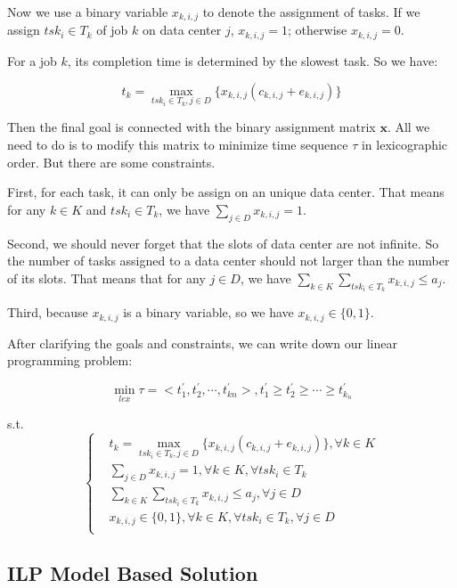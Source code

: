 \documentclass{llncs}
\begin{document}
Now we use a binary variable $ x_{k,i,j} $ to denote the assignment of tasks. If we assign $ tsk_{i} \in T_k $ of job $ k $ on data center $ j $, $ x_{k,i,j} = 1 $; otherwise  $ x_{k,i,j} = 0 $. 

For a job $ k $, its completion time is determined by the slowest task. So we have:

$$ t_k = \max\limits_{tsk_i \in T_k, j \in D} \{ x_{k,i,j}( c_{k,i,j}+e_{k,i,j}) \}$$

Then the final goal is connected with the binary assignment matrix $\mathbf{x}$. All we need to do is to modify this matrix to minimize time sequence $ \tau $ in lexicographic order. But there are some constraints. 

First, for each task, it can only be assign on an unique data center. That means for any $ k\in K $ and $ tsk_i \in T_k $, we have $ \sum\limits_{j \in D} x_{k,i,j} = 1$.

Second, we should never forget that the slots of data center are not infinite. So the number of tasks assigned to a data center should not larger than the number of its slots. That means that for any $ j \in D $, we have $  \sum\limits_{ k\in K } \sum\limits_{tsk_i \in T_k } x_{k,i,j} \leqslant a_j $.

Third, because $ x_{k,i,j} $ is a binary variable, so we have $ x_{k,i,j} \in \{0,1 \} $.

After clarifying the goals and constraints, we can write down our linear programming problem:

$$ \min\limits_{lex}  \tau = <t^{\prime}_1,t^{\prime}_2, \cdots, t^{\prime}_{kn}> , t^{\prime}_1 \geqslant t^{\prime}_2 \geqslant \cdots \geqslant t^{\prime}_{k_n} $$

s.t.
$$\left\{
\begin{aligned}  
    &t_k = \max\limits_{tsk_i \in T_k, j \in D} \{ x_{k,i,j}( c_{k,i,j}+e_{k,i,j}) \}, \forall k \in K\\
    &\sum\limits_{j \in D} x_{k,i,j} = 1, \forall k\in K ,\forall tsk_i \in T_k \\
    &\sum\limits_{ k\in K } \sum\limits_{tsk_i \in T_k } x_{k,i,j} \leqslant a_j, \forall j \in D  \\
    &x_{k,i,j} \in \{0,1 \},\forall k\in K ,\forall tsk_i \in T_k ,\forall j \in D  \\
\end{aligned}
\right.
$$

\subsection{ILP Model Based Solution}
\end{document}
